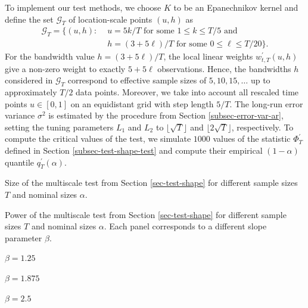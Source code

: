 To implement our test methods, we choose $K$ to be an Epanechnikov kernel and define the set $\mathcal{G}_T$ of location-scale points $(u,h)$ as
\begin{align}
\mathcal{G}_T = \big\{ (u, h): & \, \, u = 5k/T \text{ for some } 1 \le k \le T/5 \text{ and } \nonumber \\ & \, \, h = (3+5\ell)/T \text{ for some } 0 \le \ell \le T/20 \big\}. \label{grid-sim-app}
\end{align}
For the bandwidth value $h = (3 + 5\ell)/T$, the local linear weights $w_{t,T}^\prime(u,h)$ give a non-zero weight to exactly $5 + 5 \ell$ observations. Hence, the bandwidths $h$ considered in $\mathcal{G}_T$ correspond to effective sample sizes of $5, 10, 15, \ldots$ up to approximately $T/2$ data points. Moreover, we take into account all rescaled time points $u \in [0,1]$ on an equidistant grid with step length $5/T$. The long-run error variance $\sigma^2$ is estimated by the procedure from Section \ref{subsec-error-var-ar}, setting the tuning parameters $L_1$ and $L_2$ to $\lfloor \sqrt{T} \rfloor$ and $\lfloor 2\sqrt{T} \rfloor$, respectively. To compute the critical values of the test, we simulate $1000$ values of the statistic $\Phi^\prime_T$ defined in Section \ref{subsec-test-shape-test} and compute their empirical $(1-\alpha)$ quantile $q_T^\prime(\alpha)$. 


\begin{table}[t]
\footnotesize{
\begin{center}
\caption{Size of the multiscale test from Section \ref{sec-test-shape} for different sample sizes $T$ and nominal sizes $\alpha$.}
\label{tab:size_shape}
\renewcommand{\arraystretch}{1.2}

\end{center}}
\footnotesize{
\begin{center}
\caption{Power of the multiscale test from Section \ref{sec-test-shape} for different sample sizes $T$ and nominal sizes $\alpha$. Each panel corresponds to a different slope parameter $\beta$.}\label{tab:power_shape}
\begin{subtable}[b]{0.32\textwidth}
\centering
\caption{$\beta = 1.25$}\label{tab:power_050_ll_shape}
\renewcommand{\arraystretch}{1.2}

\end{subtable}
\begin{subtable}[b]{0.32\textwidth}
\centering
\caption{$\beta = 1.875$}\label{tab:power_075_ll_shape}
\renewcommand{\arraystretch}{1.2}

\end{subtable}
\begin{subtable}[b]{0.32\textwidth}
\centering
\caption{$\beta = 2.5$}\label{tab:power_100_ll_shape}
\renewcommand{\arraystretch}{1.2}

\end{subtable}
\end{center}}
\end{table}


